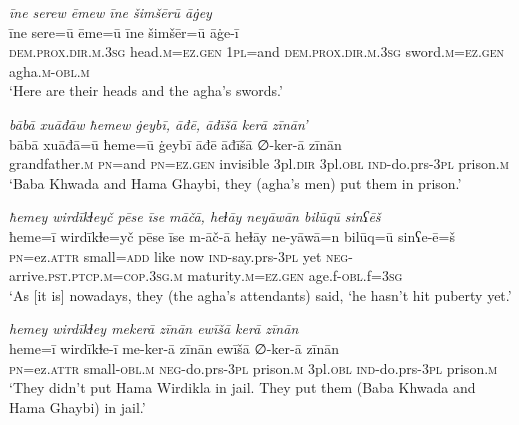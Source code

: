 \ea \label{BP.128}
\textit{īne serew ēmew īne šimšērū āġey} \\ 
\gll īne sere=ū ēme=ū īne šimšēr=ū āġe-ī \\ 
 \textsc{dem.prox}\textsc{.dir}\textsc{.m}\textsc{.3sg} head\textsc{.m}\textsc{=ez.gen} \textsc{1pl}=and \textsc{dem.prox}\textsc{.dir}\textsc{.m}\textsc{.3sg} sword\textsc{.m}\textsc{=ez.gen} agha\textsc{.m}\textsc{-obl}\textsc{.m} \\ 
\glt `Here are their heads and the agha’s swords.'
\z 
 
\ea \label{BP.131}
\textit{bābā xuāđāw ħemew ġeybī, āđē, āđīšā kerā zīnān’} \\ 
\gll bābā xuāđā=ū ħeme=ū ġeybī āđē āđīšā ∅-ker-ā zīnān \\ 
 grandfather\textsc{.m} \textsc{pn}=and \textsc{pn}\textsc{=ez.gen} invisible 3pl\textsc{.dir} 3pl\textsc{.obl} \textsc{ind-}do.prs\textsc{-3pl} prison\textsc{.m} \\ 
\glt `Baba Khwada and Hama Ghaybi, they (agha’s men) put them  in prison.'
\z 
 
\ea \label{BP.132}
\textit{ħemey wirdīkɫeyč pēse īse māčā, heɫāy neyāwān bilūqū sinʕēš} \\ 
\gll ħeme=ī wirdīkɫe=yč pēse īse m-āč-ā heɫāy ne-yāwā=n bilūq=ū sinʕe-ē=š \\ 
 \textsc{pn}=ez.\textsc{attr} small\textsc{=add} like now \textsc{ind-}say.prs\textsc{-3pl} yet \textsc{neg-}arrive\textsc{.pst}\textsc{.ptcp}\textsc{.m}\textsc{=cop}\textsc{.3sg}\textsc{.m} maturity\textsc{.m}\textsc{=ez.gen} age.f\textsc{-obl}.f\textsc{=3sg} \\ 
\glt `As [it is] nowadays, they (the agha’s attendants) said, ‘he hasn’t hit puberty yet.'
\z 
 
\ea \label{BP.138}
\textit{hemey wirdīkɫey mekerā zīnān ewīšā kerā zīnān} \\ 
\gll heme=ī wirdīkɫe-ī me-ker-ā zīnān ewīšā ∅-ker-ā zīnān \\ 
 \textsc{pn}=ez.\textsc{attr} small\textsc{-obl}\textsc{.m} \textsc{neg-}do.prs\textsc{-3pl} prison\textsc{.m} 3pl\textsc{.obl} \textsc{ind-}do.prs\textsc{-3pl} prison\textsc{.m} \\ 
\glt `They didn’t put Hama Wirdikla in jail. They put them (Baba Khwada and Hama Ghaybi) in jail.'
\z 
 
